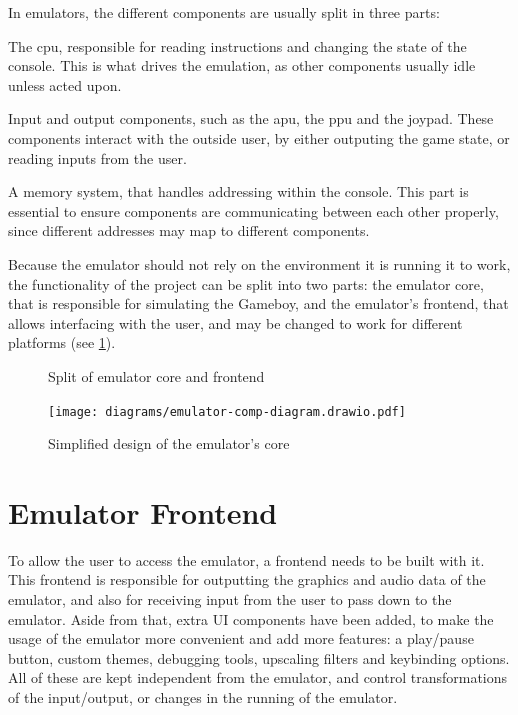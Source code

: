 \documentclass[11pt]{report}
\begin{document}
In emulators, the different components are usually split in three parts:
\begin{compactitem}
	\item The \gls{cpu}, responsible for reading instructions and changing the state of the console. This is what drives the emulation, as other components usually idle unless acted upon.
	\item Input and output components, such as the \gls{apu}, the \gls{ppu} and the joypad. These components interact with the outside user, by either outputing the game state, or reading inputs from the user.
	\item A memory system, that handles addressing within the console. This part is essential to ensure components are communicating between each other properly, since different addresses may map to different components.
\end{compactitem}

Because the emulator should not rely on the environment it is running it to work, the functionality of the project can be split into two parts: the emulator core, that is responsible for simulating the Gameboy, and the emulator's frontend, that allows interfacing with the user, and may be changed to work for different platforms (see \ref{fig:emu-back-front-split-uml}).

\begin{figure}[h]
    \centering
    \caption{Split of emulator core and frontend}
    \label{fig:emu-back-front-split-uml}
\end{figure}

\begin{figure}[h]
    \centering
    \texttt{[image: diagrams/emulator-comp-diagram.drawio.pdf]}
    \caption{Simplified design of the emulator's core}
    \label{fig:emu-core-components}
\end{figure}


\section{Emulator Frontend}

To allow the user to access the emulator, a frontend needs to be built with it. This frontend is responsible for outputting the graphics and audio data of the emulator, and also for receiving input from the user to pass down to the emulator. Aside from that, extra UI components have been added, to make the usage of the emulator more convenient and add more features: a play/pause button, custom themes, debugging tools, upscaling filters and keybinding options. All of these are kept independent from the emulator, and control transformations of the input/output, or changes in the running of the emulator.
\end{document}
